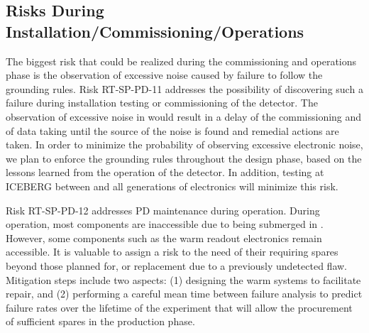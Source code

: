 \subsection{Risks During Installation/Commissioning/Operations}

The biggest risk that could be realized during the commissioning and operations phase is
the observation of excessive noise caused by failure to follow the 
grounding rules.  Risk RT-SP-PD-11 addresses the possibility of discovering such a failure during installation  testing or commissioning of the detector.  The observation of excessive noise in 
would result in a delay of the commissioning and of data taking until the source of the noise is
found and remedial actions are taken. In order to minimize the probability of observing excessive
electronic noise, we plan to enforce the grounding rules throughout the design phase, based on
the lessons learned from the operation of the  detector.  In addition, testing at ICEBERG between  and all generations of  electronics will minimize this risk.  

Risk RT-SP-PD-12 addresses PD maintenance during operation.   During operation, most  components are inaccessible due to being submerged in .  However, some components such as the warm readout electronics remain accessible. It is valuable to assign a risk to the need of their requiring spares beyond those planned for, or replacement due to a previously undetected flaw.  
Mitigation steps include two aspects: (1) designing the warm systems to facilitate repair, and (2) performing a careful mean time between failure analysis to predict failure rates over the lifetime of the experiment that will allow the procurement of sufficient spares in the production phase. 